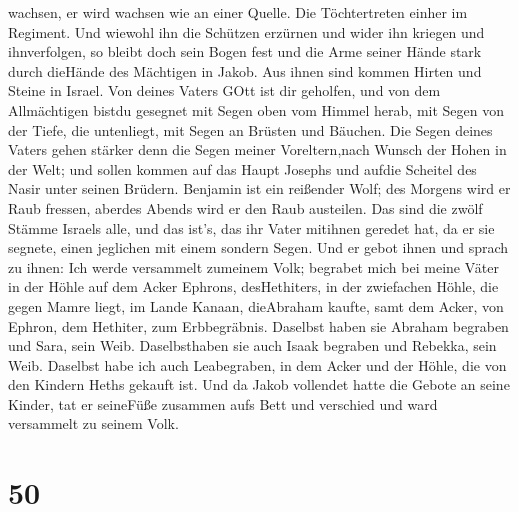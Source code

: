wachsen, er wird wachsen wie an einer Quelle. Die Töchtertreten einher
im Regiment.  Und wiewohl ihn die Schützen erzürnen und
wider ihn kriegen und ihnverfolgen,  so bleibt doch sein
Bogen fest und die Arme seiner Hände stark durch dieHände des Mächtigen
in Jakob. Aus ihnen sind kommen Hirten und Steine in Israel.
 Von deines Vaters GOtt ist dir geholfen, und von dem
Allmächtigen bistdu gesegnet mit Segen oben vom Himmel herab, mit Segen
von der Tiefe, die untenliegt, mit Segen an Brüsten und Bäuchen.
 Die Segen deines Vaters gehen stärker denn die Segen
meiner Voreltern,nach Wunsch der Hohen in der Welt; und sollen kommen
auf das Haupt Josephs und aufdie Scheitel des Nasir unter seinen
Brüdern.  Benjamin ist ein reißender Wolf; des Morgens wird
er Raub fressen, aberdes Abends wird er den Raub austeilen.
 Das sind die zwölf Stämme Israels alle, und das ist's, das
ihr Vater mitihnen geredet hat, da er sie segnete, einen jeglichen mit
einem sondern Segen.  Und er gebot ihnen und sprach zu
ihnen: Ich werde versammelt zumeinem Volk; begrabet mich bei meine Väter
in der Höhle auf dem Acker Ephrons, desHethiters,  in der
zwiefachen Höhle, die gegen Mamre liegt, im Lande Kanaan, dieAbraham
kaufte, samt dem Acker, von Ephron, dem Hethiter, zum Erbbegräbnis.
 Daselbst haben sie Abraham begraben und Sara, sein Weib.
Daselbsthaben sie auch Isaak begraben und Rebekka, sein Weib. Daselbst
habe ich auch Leabegraben,  in dem Acker und der Höhle, die
von den Kindern Heths gekauft ist.  Und da Jakob vollendet
hatte die Gebote an seine Kinder, tat er seineFüße zusammen aufs Bett
und verschied und ward versammelt zu seinem Volk.

\hypertarget{section-49}{%
\section{50}\label{section-49}}

